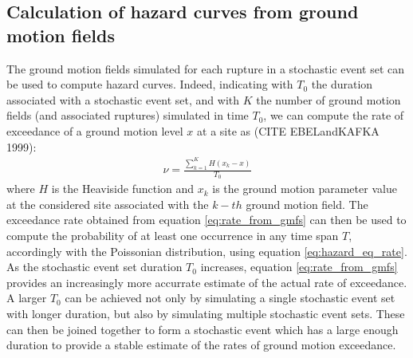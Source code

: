\subsection{Calculation of hazard curves from ground motion fields}
The ground motion fields simulated for each rupture in a stochastic event set can be used to
compute hazard curves. Indeed, indicating with $T_{0}$ the duration associated with a stochastic
event set, and with $K$ the number of ground motion fields (and associated ruptures) simulated
in time $T_{0}$, we can compute the rate of exceedance of a ground motion level $x$ at a site as (CITE EBELandKAFKA 1999):
\begin{align}
\label{eq:rate_from_gmfs}
\nu = \frac{\sum_{k=1}^{K}H(x_{k} - x)}{T_{0}}
\end{align}
where $H$ is the Heaviside function and $x_{k}$ is the ground motion parameter value at the considered site associated
with the $k-th$ ground motion field. The exceedance rate obtained from equation \ref{eq:rate_from_gmfs} can then be
used to compute the probability of at least one occurrence in any time span $T$, accordingly with the Poissonian distribution,
using equation \ref{eq:hazard_eq_rate}.\\
As the stochastic event set duration $T_{0}$ increases, equation \ref{eq:rate_from_gmfs}
provides an increasingly more accurrate estimate of the actual rate of exceedance. A larger $T_{0}$ can be achieved
not only by simulating a single stochastic event set with longer duration, but also by simulating multiple
stochastic event sets. These can then be joined together to form a stochastic event which has a large enough
duration to provide a stable estimate of the rates of ground motion exceedance.

